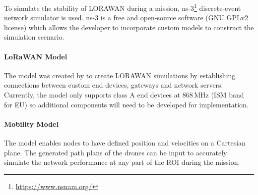 To simulate the stability of \gls{LORAWAN} during a mission, ns-3\footnote{\url{https://www.nsnam.org/}} discrete-event network simulator is used. ns-3 is a free and open-source software (GNU GPLv2 license) which allows the developer to incorporate custom models to construct the simulation scenario. 

\paragraph{LoRaWAN Model} The model was created by \cite{magrin2017lora} to create \gls{LORAWAN} simulations by establishing connections between custom end devices, gateways and network servers. Currently, the model only supports class A end devices at 868\,MHz (\gls{ISM} band for EU) so additional components will need to be developed for implementation. 

\paragraph{Mobility Model} The model enables nodes to have defined position and velocities on a Cartesian plane. The generated path plans of the drones can be input to accurately simulate the network performance at any part of the \gls{ROI} during the mission. 
